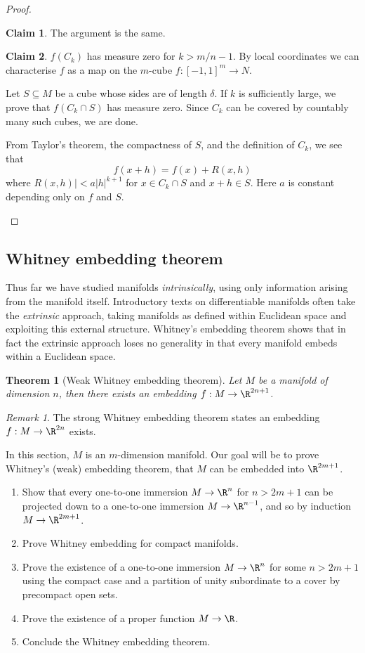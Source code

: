\documentclass[reqno]{amsart}
\newtheorem{theorem}{Theorem}
\theoremstyle{definition}
\newtheorem*{claim}{Claim}
\theoremstyle{remark}
\newtheorem*{remark}{Remark}
\begin{document}
\begin{proof}
\begin{claim}
		The argument is the same. 
	\end{claim}
	
	\begin{claim}
		$f(C_k)$ has measure zero for $k > m/n - 1$. By local coordinates we can characterise $f$ as a map on the $m$-cube $f: [-1,1]^m \to N$. 
		
		Let $S \subseteq M$ be a cube whose sides are of length $\delta$. If $k$ is sufficiently large, we prove that $f(C_k \cap S)$ has measure zero. Since $C_k$ can be covered by countably many such cubes, we are done. 
		
		From Taylor's theorem, the compactness of $S$, and the definition of $C_k$, we see that 
			\[ f(x + h) = f(x) + R(x, h) \]
		where $R(x, h)| < a|h|^{k + 1}$ for $x \in C_k \cap S$ and $x + h \in S$. Here $a$ is constant depending only on $f$ and $S$. 
	\end{claim}	
\end{proof}

\subsection{Whitney embedding theorem}

Thus far we have studied manifolds \textit{intrinsically}, using only information arising from the manifold itself. Introductory texts on differentiable manifolds often take the \textit{extrinsic} approach, taking manifolds as defined within Euclidean space and exploiting this external structure. Whitney's embedding theorem shows that in fact the extrinsic approach loses no generality in that every manifold embeds within a Euclidean space. 

\begin{theorem}[Weak Whitney embedding theorem]
	Let $M$ be a manifold of dimension $n$, then there exists an embedding $f: M \to \R^{2n + 1}$. 
\end{theorem}

\begin{remark}
	The strong Whitney embedding theorem states an embedding $f: M \to \R^{2n}$ exists. 
\end{remark}

In this section, $M$ is an $m$-dimension manifold. Our goal will be to prove Whitney's (weak) embedding theorem, that $M$ can be embedded into $\R^{2m + 1}$. 

\begin{enumerate}
	\item Show that every one-to-one immersion $M \to \R^n$ for $n > 2m + 1$ can be projected down to a one-to-one immersion $M \to \R^{n - 1}$, and so by induction $M \to \R^{2m + 1}$. 
	\item Prove Whitney embedding for compact manifolds. 
	\item Prove the existence of a one-to-one immersion $M \to \R^n$ for some $n > 2m + 1$ using the compact case and a partition of unity subordinate to a cover by precompact open sets. 
	\item Prove the existence of a proper function $M \to \R$. 
	\item Conclude the Whitney embedding theorem. 	
\end{enumerate}
\end{document}
